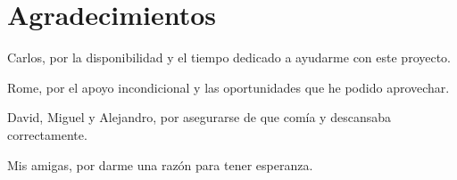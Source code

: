 
\chapter*{Agradecimientos}



Carlos, por la disponibilidad y el tiempo dedicado a ayudarme con este proyecto.

Rome, por el apoyo incondicional y las oportunidades que he podido aprovechar.

David, Miguel y Alejandro, por asegurarse de que comía y descansaba correctamente.

Mis amigas, por darme una razón para tener esperanza.







